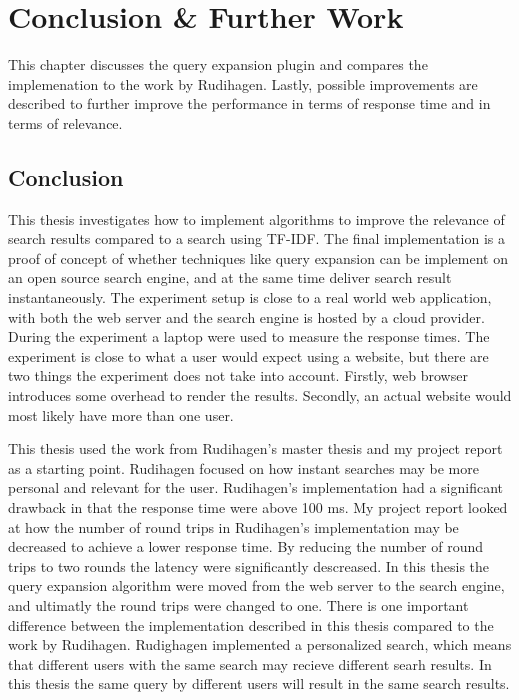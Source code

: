 \chapter{Conclusion \& Further Work}
\label{ch:conclusion}
This chapter discusses the query expansion plugin and compares the implemenation to the work by Rudihagen.
Lastly,
possible improvements are described to further improve the performance in terms of response time and in terms of relevance.

\section{Conclusion}
This thesis investigates how to implement algorithms to improve the relevance of search results compared to a search using TF-IDF.
The final implementation is a proof of concept of whether techniques like query expansion can be implement on an open source search engine,
and at the same time deliver search result instantaneously.
The experiment setup is close to a real world web application,
with both the web server and the search engine is hosted by a cloud provider.
During the experiment a laptop were used to measure the response times.
The experiment is close to what a user would expect using a website,
but there are two things the experiment does not take into account.
Firstly, web browser introduces some overhead to render the results.
Secondly, an actual website would most likely have more than one user.

This thesis used the work from Rudihagen's master thesis \cite{master-thesis} and my project report \cite{project-report} as a starting point.
Rudihagen focused on how instant searches may be more personal and relevant for the user.
Rudihagen's implementation had a significant drawback in that the response time were above 100 ms.
My project report looked at how the number of round trips in Rudihagen's implementation may be decreased to achieve a lower response time.
By reducing the number of round trips to two rounds the latency were significantly descreased.
In this thesis the query expansion algorithm were moved from the web server to the search engine,
and ultimatly the round trips were changed to one.
There is one important difference between the implementation described in this thesis compared to the work by Rudihagen.
Rudighagen implemented a personalized search, which means that different users with the same search may recieve different searh results.
In this thesis the same query by different users will result in the same search results.

